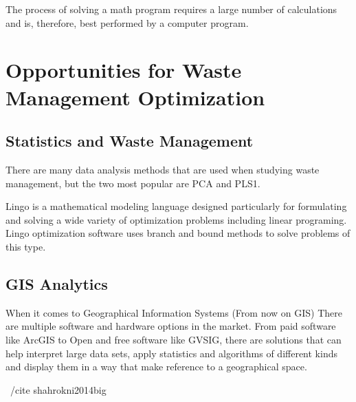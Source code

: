 \documentclass[sigconf]{acmart}
\begin{document}
The process of solving a math program requires a large number of calculations and is, therefore, best performed by a computer program. ~\cite{akbarpour2016}


\section{Opportunities for Waste Management Optimization}





\subsection{Statistics and Waste Management}

There are many data analysis methods that are used when studying waste management, but the two most popular are PCA and PLS1. 
~\cite{bohm2013}

Lingo is a mathematical modeling language designed particularly for formulating and solving a wide variety of optimization problems including linear programing. Lingo optimization software uses branch and bound methods to solve problems of this type. ~\cite{akbarpour2016}

\subsection{GIS Analytics}

When it comes to Geographical Information Systems (From now on GIS) There are multiple software and hardware options in the market. From paid software like ArcGIS to Open and free software like GVSIG, there are solutions that can help interpret large data sets, apply statistics and algorithms of different kinds and display them in a way that make reference to a geographical space. %

~/cite {shahrokni2014big}
\end{document}
